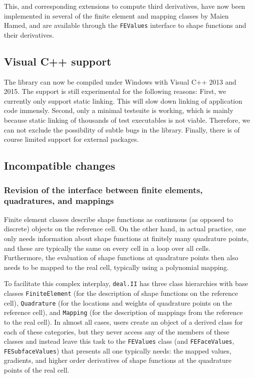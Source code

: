 \documentclass{ansarticle-preprint}
\newcommand{\specialword}[1]{\texttt{#1}}
\newcommand{\dealii}{{\specialword{deal.II}}}
\begin{document}
This, and corresponding extensions to compute third derivatives, have
now been implemented in several of the finite element and mapping
classes by Maien Hamed, and are available through the
\texttt{FEValues} interface to shape functions and their derivatives.

\subsection{Visual C++ support}

The library can now be compiled under Windows with Visual C++ 2013 and
2015. The support is still experimental for the following reasons: First, we
currently only support static linking. This will slow down linking of
application code immensly.  Second, only a minimal testsuite is working, which
is mainly because static linking of thousands of test executables is not
viable. Therefore, we can not exclude the possibility of subtle bugs in the
library.  Finally, there is of course limited support for external packages.

\subsection{Incompatible changes}

\subsubsection{Revision of the interface between finite elements,
  quadratures, and mappings}

Finite element classes describe shape functions as continuous (as
opposed to discrete) objects on the reference cell. On the other hand,
in actual practice, one only needs information about shape functions
at finitely many quadrature points, and these are typically the same
on every cell in a loop over all cells. Furthermore, the evaluation of
shape functions at quadrature points then also needs to be mapped to
the real cell, typically using a polynomial mapping.

To facilitate this complex interplay, \dealii{} has three class
hierarchies with base classes \texttt{FiniteElement} (for the
description of shape functions on the reference cell),
\texttt{Quadrature} (for the locations and weights of quadrature
points on the reference cell), and \texttt{Mapping} (for the
description of mappings from the reference to the real cell). In
almost all cases, users create an object of a derived class for each
of these categories, but they never access any of the members of these
classes and instead leave this task to the \texttt{FEValues} class
(and \texttt{FEFaceValues}, \texttt{FESubfaceValues}) that presents
all one typically needs: the mapped values, gradients, and
higher order derivatives of shape functions at the quadrature points
of the real cell.
\end{document}
